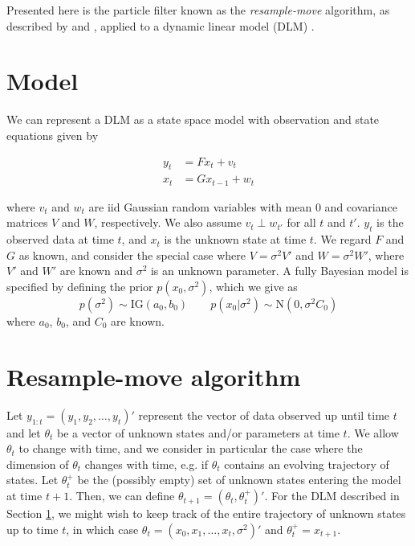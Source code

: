 \documentclass{article}
\begin{document}
Presented here is the particle filter known as the \emph{resample-move} algorithm, as described by \citet{Gilk:Berz:foll:2001} and \citet{Berz:gilk:2001}, applied to a dynamic linear model (DLM) \citep{petris2009dynamic}.

\section{Model} \label{sec:model}

We can represent a DLM as a state space model with observation and state equations given by

\begin{align}
y_t &= Fx_t + v_t \label{eqn:obs} \\
x_t &= Gx_{t-1} + w_t \label{eqn:state}
\end{align}

\noindent where $v_t$ and $w_t$ are iid Gaussian random variables with mean 0 and covariance matrices $V$ and $W$, respectively. We also assume $v_t \perp w_{t'}$ for all $t$ and $t'$. $y_t$ is the observed data at time $t$, and $x_t$ is the unknown state at time $t$. We regard $F$ and $G$ as known, and consider the special case where $V = \sigma^2V'$ and $W = \sigma^2W'$, where $V'$ and $W'$ are known and $\sigma^2$ is an unknown parameter. A fully Bayesian model is specified by defining the prior $p(x_0,\sigma^2)$, which we give as \[p(\sigma^2) \sim \mbox{IG}(a_0,b_0) \qquad p(x_0|\sigma^2) \sim \mbox{N}(0,\sigma^2C_0)\]
\noindent where $a_0$, $b_0$, and $C_0$ are known.

\section{Resample-move algorithm}

Let $y_{1:t} = (y_1,y_2,\ldots,y_t)'$ represent the vector of data observed up until time $t$ and let $\theta_t$ be a vector of unknown states and/or parameters at time $t$. We allow $\theta_t$ to change with time, and we consider in particular the case where the dimension of $\theta_t$ changes with time, e.g. if $\theta_t$ contains an evolving trajectory of states. Let $\theta^{+}_t$ be the (possibly empty) set of unknown states entering the model at time $t+1$. Then, we can define $\theta_{t+1} = (\theta_t,\theta^{+}_t)'$. For the DLM described in Section \ref{sec:model}, we might wish to keep track of the entire trajectory of unknown states up to time $t$, in which case $\theta_t = (x_0,x_1,\ldots,x_t,\sigma^2)'$ and $\theta^{+}_t = x_{t+1}$.
\end{document}
